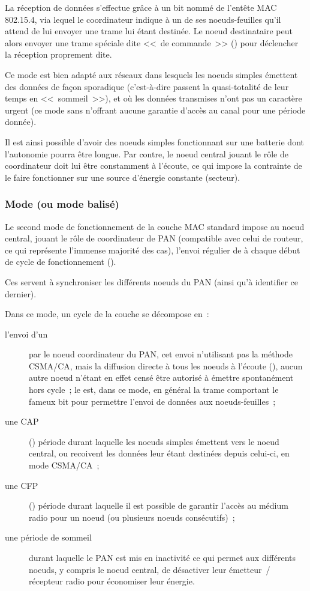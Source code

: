 La réception de données s'effectue grâce à un bit nommé  de l'entête MAC 802.15.4, via lequel le coordinateur indique
à un de ses noeuds-feuilles qu'il attend de lui envoyer une trame lui
étant destinée. Le noeud destinataire peut alors envoyer une trame
spéciale dite <<~de commande~>> () pour déclencher
la réception proprement dite.

Ce mode est bien adapté aux réseaux dans lesquels les noeuds simples
émettent des données de façon sporadique (c'est-à-dire passent la
quasi-totalité de leur temps en <<~sommeil~>>), et où les données transmises
n'ont pas un caractère urgent (ce mode sans  n'offrant
aucune garantie d'accès au canal pour une période donnée).

Il est ainsi possible d'avoir des noeuds simples fonctionnant sur une
batterie dont l'autonomie pourra être longue. Par contre, le noeud central
jouant le rôle de coordinateur doit lui être constamment à l'écoute, ce qui
impose la contrainte de le faire fonctionner sur une source d'énergie
constante (secteur).

\subsubsection{Mode  (ou mode balisé)}
\label{Par802154MACBeacon}

Le second mode de fonctionnement de la couche MAC standard impose au
noeud central, jouant le rôle de coordinateur de PAN (compatible avec
celui de routeur, ce qui représente l'immense majorité des cas), l'envoi
régulier de  à chaque début de cycle de fonctionnement
().

Ces  servent à synchroniser les différents noeuds du PAN
(ainsi qu'à identifier ce dernier).

Dans ce mode, un cycle de la couche se décompose en~:
\begin{description}
\item[l'envoi d'un ] par le noeud coordinateur du PAN, cet
envoi n'utilisant pas la méthode CSMA/CA, mais la diffusion directe à tous
les noeuds à l'écoute (), aucun autre noeud n'étant
en effet censé être autorisé à émettre spontanément hors cycle~;
le  est, dans ce mode, en général la trame comportant
le fameux bit  pour permettre l'envoi de
données aux noeuds-feuilles~;
\item[une CAP] () période durant laquelle
les noeuds simples émettent vers le noeud central, ou recoivent les données
leur étant destinées depuis celui-ci, en mode CSMA/CA~;
\item[une CFP] () période durant laquelle
il est possible de garantir l'accès au médium radio pour un noeud (ou
plusieurs noeuds consécutifs)~;
\item[une période de sommeil] durant laquelle le PAN est mis en inactivité
ce qui permet aux différents noeuds, y compris le noeud central, de
désactiver leur émetteur~/ récepteur radio pour économiser leur énergie.
\end{description}

